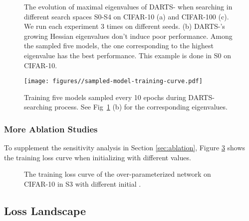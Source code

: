 \documentclass{article} \usepackage{iclr2021_conference,times}
\begin{document}
\begin{figure}[ht]
	\centering
	\caption{The evolution of maximal eigenvalues of DARTS- when searching in different search spaces S0-S4 on CIFAR-10 (a) and CIFAR-100 (c). We run each experiment 3 times on different seeds. (b) DARTS-'s growing Hessian eigenvalues don't induce poor performance. Among the sampled five models, the one corresponding to the highest eigenvalue has the best performance. This example is done in S0 on CIFAR-10.}
	\label{fig:eigen_value}
\end{figure}

\begin{figure}[ht]
\centering
\texttt{[image: figures//sampled-model-training-curve.pdf]}
\caption{Training five models sampled every 10 epochs during DARTS- searching process. See Fig~\ref{fig:eigen_value} (b) for the corresponding eigenvalues.}
\label{fig:sample-model-training-curve}
\end{figure}



\subsubsection{More Ablation Studies}\label{app:ablation} 


To supplement the sensitivity analysis in Section \ref{sec:ablation}, Figure \ref{fig:beta-loss} shows the training loss curve when initializing  with different values.
\begin{figure}[ht]
\centering
{}
\caption{The training loss curve of the over-parameterized network on CIFAR-10 in S3 with different initial .}
\label{fig:beta-loss}
\end{figure}






 

\subsection{Loss Landscape}
\end{document}
